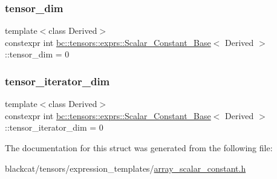 \subsubsection{\texorpdfstring{tensor\+\_\+dim}{tensor\_dim}}
{\footnotesize\ttfamily template$<$class Derived$>$ \\
constexpr int \hyperlink{structbc_1_1tensors_1_1exprs_1_1Scalar__Constant__Base}{bc\+::tensors\+::exprs\+::\+Scalar\+\_\+\+Constant\+\_\+\+Base}$<$ Derived $>$\+::tensor\+\_\+dim = 0\hspace{0.3cm}{\ttfamily [static]}}

\mbox{\label{structbc_1_1tensors_1_1exprs_1_1Scalar__Constant__Base_ad45151f730e8c2730fab11c97f902c73}} 
\subsubsection{\texorpdfstring{tensor\+\_\+iterator\+\_\+dim}{tensor\_iterator\_dim}}
{\footnotesize\ttfamily template$<$class Derived$>$ \\
constexpr int \hyperlink{structbc_1_1tensors_1_1exprs_1_1Scalar__Constant__Base}{bc\+::tensors\+::exprs\+::\+Scalar\+\_\+\+Constant\+\_\+\+Base}$<$ Derived $>$\+::tensor\+\_\+iterator\+\_\+dim = 0\hspace{0.3cm}{\ttfamily [static]}}



The documentation for this struct was generated from the following file\+:\begin{DoxyCompactItemize}
\item 
blackcat/tensors/expression\+\_\+templates/\hyperlink{array__scalar__constant_8h}{array\+\_\+scalar\+\_\+constant.\+h}\end{DoxyCompactItemize}
